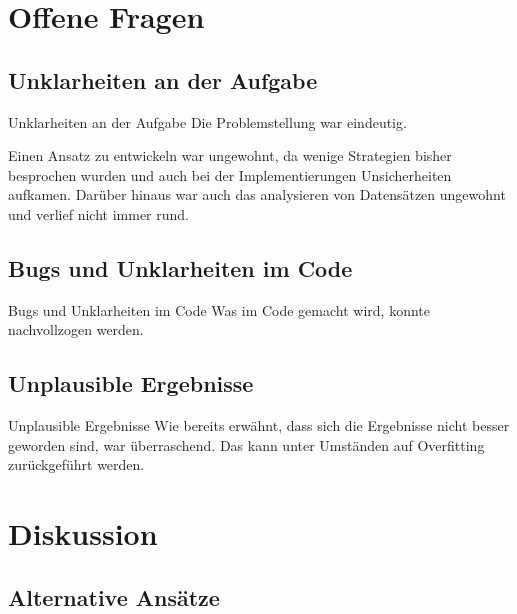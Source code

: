 \documentclass[compress]{beamer}
\begin{document}
\section{Offene Fragen}
\label{sec:fragen}

\subsection{Unklarheiten an der Aufgabe}
\label{subsec:unklar}

\begin{frame}{Unklarheiten an der Aufgabe}
  Die Problemstellung war eindeutig.

  \bigskip Einen Ansatz zu entwickeln war ungewohnt, da wenige
  Strategien bisher besprochen wurden und auch bei der
  Implementierungen Unsicherheiten aufkamen.  Darüber hinaus war auch
  das analysieren von Datensätzen ungewohnt und verlief nicht immer
  rund.
\end{frame}

\subsection{Bugs und Unklarheiten im Code}
\label{subsec:code}

\begin{frame}{Bugs und Unklarheiten im Code}
  Was im Code gemacht wird, konnte nachvollzogen werden.
\end{frame}

\subsection{Unplausible Ergebnisse}
\label{subsec:unplausibel}

\begin{frame}{Unplausible Ergebnisse}
  Wie bereits erwähnt, dass sich die Ergebnisse nicht besser geworden
  sind, war überraschend.  Das kann unter Umständen auf Overfitting
  zurückgeführt werden.


\end{frame}

\section{Diskussion}
\label{sec:disku}

\subsection{Alternative Ansätze}
\label{subsec:ansatz}
\end{document}
